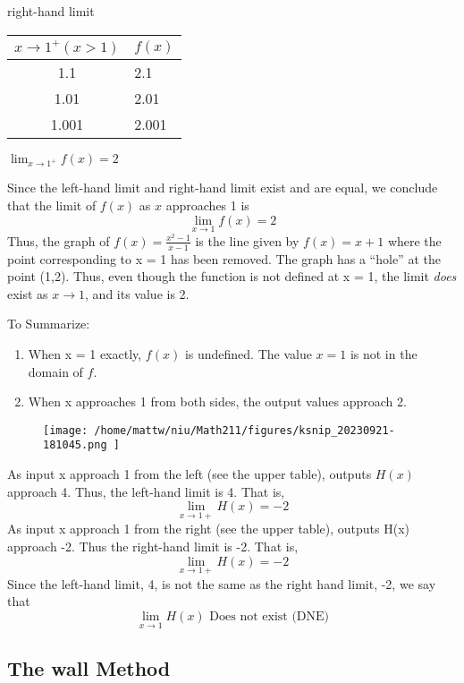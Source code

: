 \documentclass{report}
\begin{document}
\begin{minipage}{0.39\textwidth}
  \hspace{6mm}right-hand limit
  \vspace{2mm}

	\begin{tabular}{|c|l|}
\hline$x \rightarrow 1^{+}(x>1)$ & $f(x)$ \\
\hline 1.1 & 2.1 \\
1.01 & 2.01 \\
1.001 & 2.001 \\
\hline
\end{tabular}
\vspace{4mm}

\hspace{10mm}$\displaystyle\lim_{x\to 1^+ }f(x) = 2$
\end{minipage}
\bigbreak \noindent
Since the left-hand limit and right-hand limit exist and are equal, we conclude that the limit of $f(x)$ as $x$ approaches 1 is
$$\displaystyle\lim_{x\to 1}f(x) = 2$$
\bigbreak \noindent
Thus, the graph of $f(x) = \frac{x^2-1}{x-1}$ is the line given by $f(x) = x + 1$ where the point corresponding to x = 1 has been removed.
\bigbreak \noindent
The graph has a ``hole'' at the point (1,2). Thus, even though the function is not defined at x = 1, the limit \textit{does} exist as $x\to 1$, and its value is 2.
\begin{figure}[ht]
    \centering
\end{figure}
\bigbreak \noindent
To Summarize:
\begin{enumerate}
  \item When x = 1 exactly, $f(x)$ is undefined. The value $x = 1$ is not in the domain of $f$.
  \item When x approaches 1 from both sides, the output values approach 2.
\end{enumerate}
\pagebreak
{}
\sol{}
\bigbreak \noindent
\begin{figure}[ht]
\centering
\texttt{[image:  /home/mattw/niu/Math211/figures/ksnip\_20230921-181045.png ]}
\end{figure}
\bigbreak \noindent
As input x approach 1 from the left (see the upper table), outputs $H(x)$ approach 4.
Thus, the left-hand limit is 4. That is,
$$\displaystyle\lim_{x\to 1+}H(x) = -2$$
\bigbreak \noindent
As input x approach 1 from the right (see the upper table), outputs H(x) approach -2. Thus the right-hand limit is -2. That is,
$$\displaystyle\lim_{x\to 1+}H(x) = -2$$
\bigbreak \noindent
Since the left-hand limit, 4, is not the same as the right hand limit, -2, we say that
$$\displaystyle\lim_{x\to 1}H(x) \text{ Does not exist (DNE)}$$
\bigbreak \noindent \bigbreak \noindent
\subsection{The wall Method}
\bigbreak \noindent
\end{document}
